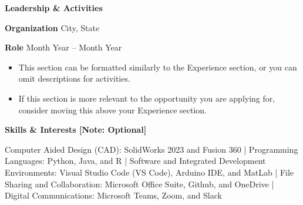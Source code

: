 \documentclass[18pt]{article}
\begin{document}
\begin{center}
    \textbf{Leadership \& Activities}
\end{center}

\textbf{Organization}	\hfill City, State

\textbf{Role} \hfill Month Year – Month Year
\begin{itemize}[noitemsep]
    \item This section can be formatted similarly to the Experience section, or you can omit descriptions for activities.
    \item If this section is more relevant to the opportunity you are applying for, consider moving this above your Experience section.
\end{itemize}

\begin{center}
    \textbf{Skills \& Interests [Note: Optional]}
\end{center}

\justify Computer Aided Design (CAD): SolidWorks 2023 and Fusion 360 | Programming Languages: Python, Java, and R | Software and Integrated Development Environments: Visual Studio Code (VS Code), Arduino IDE, and MatLab | File Sharing and Collaboration: Microsoft Office Suite, Github, and OneDrive | Digital Communications: Microsoft Teams, Zoom, and Slack
\end{document}
